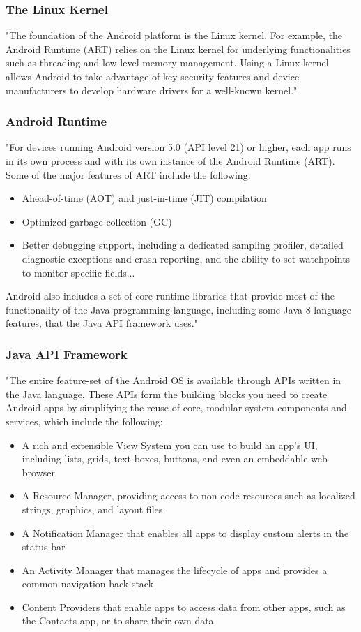 \subsubsection{The Linux Kernel}
"The foundation of the Android platform is the Linux kernel. For example, the Android Runtime (ART) relies on the Linux kernel for underlying functionalities such as threading and low-level memory management.
Using a Linux kernel allows Android to take advantage of key security features and device manufacturers to develop hardware drivers for a well-known kernel."~\cite{android_developers_2018}


\subsubsection{Android Runtime}
"For devices running Android version 5.0 (API level 21) or higher, each app runs in its own process and with its own instance of the Android Runtime (ART). Some of the major features of ART include the following:

\begin{itemize}
 \item Ahead-of-time (AOT) and just-in-time (JIT) compilation
 \item Optimized garbage collection (GC)
 \item Better debugging support, including a dedicated sampling profiler, detailed diagnostic exceptions and crash reporting, and the ability to set watchpoints to monitor specific fields...
\end{itemize}
  
Android also includes a set of core runtime libraries that provide most of the functionality of the Java programming language, including some Java 8 language features, that the Java API framework uses."~\cite{android_developers_2018}
 
 \subsubsection{Java API Framework}
 "The entire feature-set of the Android OS is available through APIs written in the Java language. These APIs form the building blocks you need to create Android apps by simplifying the reuse of core, modular system components and services, which include the following:
 
 \begin{itemize}	
 	\item A rich and extensible View System you can use to build an app’s UI, including lists, grids, text boxes, buttons, and even an embeddable web browser
 	\item A Resource Manager, providing access to non-code resources such as localized strings, graphics, and layout files
 	\item A Notification Manager that enables all apps to display custom alerts in the status bar
 	\item An Activity Manager that manages the lifecycle of apps and provides a common navigation back stack
 	\item Content Providers that enable apps to access data from other apps, such as the Contacts app, or to share their own data	
 \end{itemize}

